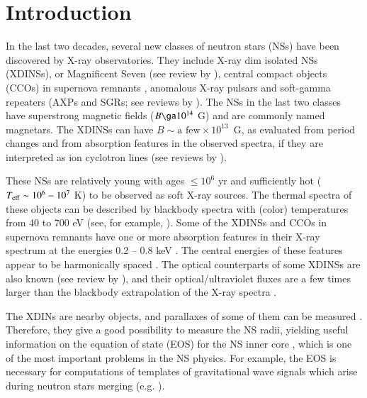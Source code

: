 \documentclass{aa}
\begin{document}


\maketitle
%


\section{Introduction}

In the last two decades, several new classes of neutron stars (NSs) have
been discovered by X-ray observatories. They include X-ray dim isolated NSs
(XDINSs), or Magnificent Seven (see review by \citealt{Haberl:07}), 
central compact objects (CCOs) in supernova 
remnants \citep{Pavlovetal:02a,Pavlovetal:04}, anomalous X-ray pulsars 
and soft-gamma repeaters (AXPs and SGRs; see reviews by 
\citealt{Kaspi:07,Mereghettietal:07,Mereghetti:08}). 
The NSs in the 
last two classes have superstrong magnetic fields ($B \ga 10^{14}$ G) and 
are commonly named magnetars. The XDINSs can have 
$B \sim \mbox{a few} \times 10^{13}$~G, 
as evaluated from period changes and from absorption features in the observed 
spectra, if they are interpreted as ion cyclotron lines (see reviews by 
\citealt{Haberl:07,vKK:07}). 
 
These NSs are relatively young with ages $\le 10^6$ yr and 
sufficiently hot ($T_{\rm eff} \sim 10^6 - 10^7$ K) to be observed as soft X-ray 
sources. 
The thermal spectra of 
these objects can be described by blackbody spectra with (color) temperatures 
from 40 to 700 eV (see, for example, \citealt{Mereghettietal:02}). 
Some of the XDINSs and CCOs in supernova 
remnants have one or more absorption features in their X-ray spectrum at the 
energies 0.2 -- 0.8 keV \citep{Haberl:07}. 
 The central energies of these features appear to be 
harmonically spaced \citep{Sanwaletal:02,Swopeetal:07,vKK:07,Haberl:07}. The optical 
counterparts of some XDINSs 
are also known (see review by 
\citealt{Mignanietal:07}), and their optical/ultraviolet fluxes are a few 
times larger than the  
blackbody extrapolation of the X-ray spectra 
\citep{Burwitzetal:01,Burwitzetal:03,Kaplanetal:03,Motchetal:03}. 
 
The XDINs are nearby objects, and parallaxes of some of them can 
be measured \citep{Kaplanetal:02a}. Therefore, they give a good possibility to 
measure the NS 
radii, yielding useful information on the equation of state 
(EOS) for the NS inner core \citep{Trumperetal:04,LP07}, 
which is 
one of the most important problems in the NS physics. For example, the 
EOS is necessary 
for computations of templates of gravitational wave signals which arise 
during neutron stars merging (e.g. \citealt{Baiottietal:08}). 
 
\end{document}
